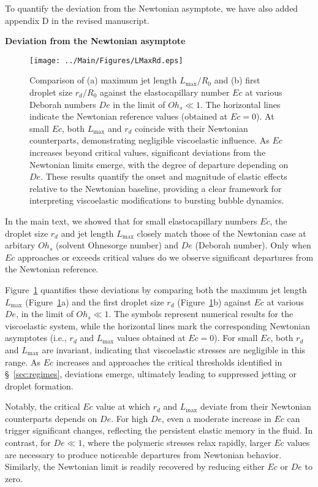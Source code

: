 \documentclass[]{article}
\newcommand{\oo}{\color{magenta} \normalfont}
\newcommand{\bb}{\color{black} \normalfont}
\begin{document}
\begin{enumerate}
        To quantify the deviation from the Newtonian asymptote, we have also added appendix D in the revised manuscript. 

        \oo
        \textbf{Deviation from the Newtonian asymptote}

        \begin{figure}
            \centering
            \texttt{[image: ../Main/Figures/LMaxRd.eps]}
            \caption{{\oo Comparison of (a) maximum jet length $L_{\text{max}}/R_0$ and (b) first droplet size $r_d/R_0$ against the elastocapillary number $Ec$ at various Deborah numbers $De$ in the limit of $Oh_s \ll 1$. The horizontal lines indicate the Newtonian reference values (obtained at $Ec=0$). At small $Ec$, both $L_{\text{max}}$ and $r_d$ coincide with their Newtonian counterparts, demonstrating negligible viscoelastic influence. As $Ec$ increases beyond critical values, significant deviations from the Newtonian limits emerge, with the degree of departure depending on $De$. These results quantify the onset and magnitude of elastic effects relative to the Newtonian baseline, providing a clear framework for interpreting viscoelastic modifications to bursting bubble dynamics.\bb}}
            \label{fig:devNewt}
        \end{figure}

        In the main text, we showed that for small elastocapillary numbers $Ec$, the droplet size $r_d$ and jet length $L_{\text{max}}$ closely match those of the Newtonian case at arbitary $Oh_s$ (solvent Ohnesorge number) and $De$ (Deborah number). Only when $Ec$ approaches or exceeds critical values do we observe significant departures from the Newtonian reference.

        Figure~\ref{fig:devNewt} quantifies these deviations by comparing both the maximum jet length $L_{\text{max}}$ (Figure~\ref{fig:devNewt}a) and the first droplet size $r_d$ (Figure~\ref{fig:devNewt}b) against $Ec$ at various $De$, in the limit of $Oh_s \ll 1$. The symbols represent numerical results for the viscoelastic system, while the horizontal lines mark the corresponding Newtonian asymptotes (i.e., $r_d$ and $L_{\text{max}}$ values obtained at $Ec=0$). For small $Ec$, both $r_d$ and $L_{\text{max}}$ are invariant, indicating that viscoelastic stresses are negligible in this range. As $Ec$ increases and approaches the critical thresholds identified in \S~\ref{sec:regimes}, deviations emerge, ultimately leading to suppressed jetting or droplet formation.

        Notably, the critical $Ec$ value at which $r_d$ and $L_{\text{max}}$ deviate from their Newtonian counterparts depends on $De$. For high $De$, even a moderate increase in $Ec$ can trigger significant changes, reflecting the persistent elastic memory in the fluid. In contrast, for $De \ll 1$, where the polymeric stresses relax rapidly, larger $Ec$ values are necessary to produce noticeable departures from Newtonian behavior. Similarly, the Newtonian limit is readily recovered by reducing either $Ec$ or $De$ to zero.


\end{enumerate}
\end{document}
